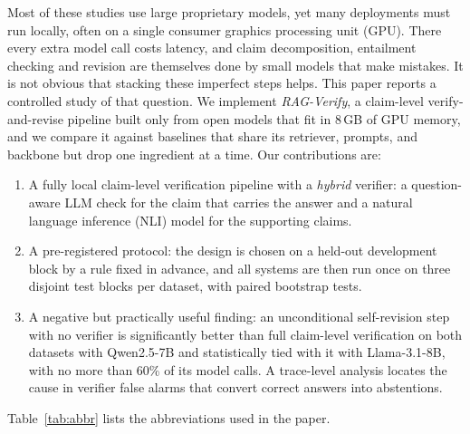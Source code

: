 \documentclass{svproc}
\begin{document}
Most of these studies use large proprietary models, yet many deployments must run locally, often on a single consumer graphics processing unit (GPU). There every extra model call costs latency, and claim decomposition, entailment checking and revision are themselves done by small models that make mistakes. It is not obvious that stacking these imperfect steps helps. This paper reports a controlled study of that question. We implement \emph{RAG-Verify}, a claim-level verify-and-revise pipeline built only from open models that fit in 8\,GB of GPU memory, and we compare it against baselines that share its retriever, prompts, and backbone but drop one ingredient at a time. Our contributions are:
\begin{enumerate}
\item A fully local claim-level verification pipeline with a \emph{hybrid} verifier: a question-aware LLM check for the claim that carries the answer and a natural language inference (NLI) model for the supporting claims.
\item A pre-registered protocol: the design is chosen on a held-out development block by a rule fixed in advance, and all systems are then run once on three disjoint test blocks per dataset, with paired bootstrap tests.
\item A negative but practically useful finding: an unconditional self-revision step with no verifier is significantly better than full claim-level verification on both datasets with Qwen2.5-7B and statistically tied with it with Llama-3.1-8B, with no more than 60\% of its model calls. A trace-level analysis locates the cause in verifier false alarms that convert correct answers into abstentions.
\end{enumerate}
Table~\ref{tab:abbr} lists the abbreviations used in the paper.
\end{document}
